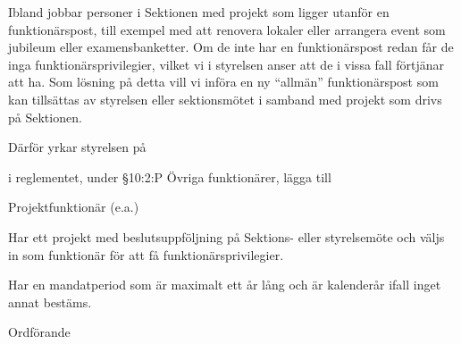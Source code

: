 \documentclass[../_main/handlingar.tex]{subfiles}
\begin{document}

Ibland jobbar personer i Sektionen med projekt som ligger utanför en funktionärspost, till exempel med att renovera lokaler eller arrangera event som jubileum eller examensbanketter. Om de inte har en funktionärspost redan får de inga funktionärsprivilegier, vilket vi i styrelsen anser att de i vissa fall förtjänar att ha. Som lösning på detta vill vi införa en ny ``allmän'' funktionärspost som kan tillsättas av styrelsen eller sektionsmötet i samband med projekt som drivs på Sektionen.

Därför yrkar styrelsen på

\begin{attsatser}
    \att i reglementet, under \S10:2:P Övriga funktionärer, lägga till\par
        Projektfunktionär (e.a.)
        \begin{tightdashlist}
            \item Har ett projekt med beslutsuppföljning på Sektions- eller styrelsemöte och väljs in som funktionär för att få funktionärsprivilegier.
            \item Har en mandatperiod som är maximalt ett år lång och är kalenderår ifall inget annat bestäms.
        \end{tightdashlist}
\end{attsatser}

\begin{signatures}{1}
    \ist
    \signature{\ordf}{Ordförande}
\end{signatures}
\end{document}

